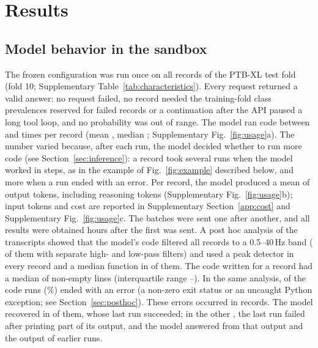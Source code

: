 \FloatBarrier
\section{Results}

\subsection{Model behavior in the sandbox}
The frozen configuration was run once on all \NTest{} records of the PTB-XL test fold
(fold 10; Supplementary Table~\ref{tab:characteristics}). Every request returned a valid answer: no request failed, no
record needed the training-fold class prevalences reserved for failed records or a continuation after the API paused
a long tool loop, and no probability was out of range. The model ran code between \CodeRunsMin{} and \CodeRunsMax{}
times per record (mean \CodeRunsMean, median \CodeRunsMedian; Supplementary Fig.~\ref{fig:usage}a). The number
varied because, after each run, the model decided whether to run more code (see Section~\ref{sec:inference}): a record took several runs
when the model worked in steps, as in the example of Fig.~\ref{fig:example} described below, and more when a run ended
with an error. Per record, the model
produced a mean of \OutputTokensMean{} output tokens, including \ThinkingTokensMean{} reasoning tokens (Supplementary
Fig.~\ref{fig:usage}b); input tokens and cost are reported in Supplementary Section~\ref{app:cost} and Supplementary
Fig.~\ref{fig:usage}c. The \NBatches{} batches were sent one after another, and all results were obtained
\TestHours{} hours after the first was sent. A post hoc analysis of the transcripts showed that the model's code
filtered all \PHFilterFortyN{} records to a 0.5--40\,Hz band (\PHFilterSeparateN{} of them with separate high- and
low-pass filters) and used a peak detector in every record and a median function in \PHMedianN{} of them. The code
written for a record had a median of \PHSandboxLinesMedian{} non-empty lines (interquartile range
\PHSandboxLinesQOne--\PHSandboxLinesQThree). In the same analysis, \PHSandboxErrorsTotal{} of the
\PHSandboxCodeRunsTotal{} code runs (\PHSandboxErrorRatePct\%) ended with an error (a non-zero exit status or an
uncaught Python exception; see Section~\ref{sec:posthoc}). These errors occurred in \PHSandboxRecordsWithErrorN{} records. The model
recovered in \PHSandboxRecoveredN{} of them, whose last run succeeded; in the other \PHSandboxLastRunErrorN, the last run
failed after printing part of its output, and the model answered from that output and the output of earlier runs.

